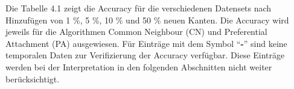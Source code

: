 Die Tabelle 4.1 zeigt die Accuracy für die verschiedenen Datensets nach Hinzufügen von 1 \%, 5 \%, 10 \% und 50 \% neuen Kanten. %
Die Accuracy wird jeweils für die Algorithmen Common Neighbour (CN) und Preferential Attachment (PA) ausgewiesen.
Für Einträge mit dem Symbol ``\textbf{-}'' sind keine temporalen Daten zur Verifizierung der Accuracy verfügbar.
Diese Einträge werden bei der Interpretation in den folgenden Abschnitten nicht weiter berücksichtigt.
\begin{table}[]
    \centering
    \label{tab_accuracy_iter}
    \caption{Erreichte Accuracy in \%}
\end{table}

